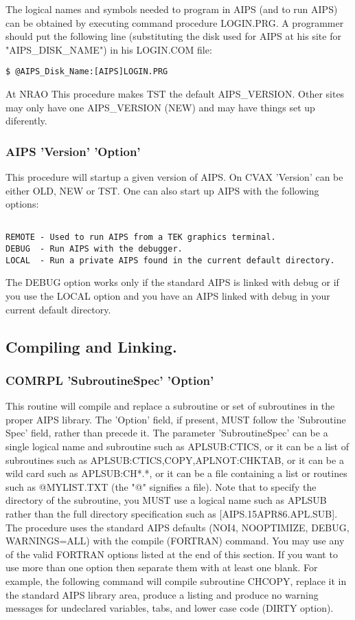 The logical names and symbols needed to program in AIPS (and to run
AIPS) can be obtained by executing command procedure LOGIN.PRG.  A
programmer should put the following line (substituting the disk used
for AIPS at his site for "AIPS\_DISK\_NAME") in his LOGIN.COM file:
\begin{verbatim}
$ @AIPS_Disk_Name:[AIPS]LOGIN.PRG
\end{verbatim}

At NRAO This procedure makes TST the default AIPS\_VERSION.  Other
sites may only have one AIPS\_VERSION (NEW) and may have things set up
diferently.

\subsubsection{ AIPS 'Version' 'Option' }

This procedure will startup a given version of AIPS.  On CVAX
'Version' can be either OLD, NEW or TST.  One can
also start up AIPS with the following options:
\begin{verbatim}

REMOTE - Used to run AIPS from a TEK graphics terminal.
DEBUG  - Run AIPS with the debugger.
LOCAL  - Run a private AIPS found in the current default directory.

\end{verbatim}

The DEBUG option works only if the standard AIPS is linked with debug
or if you use the LOCAL option and you have an AIPS linked with debug
in your current default directory.

\subsection{ Compiling and Linking. }
\subsubsection{ COMRPL 'SubroutineSpec' 'Option' }

This routine will compile and replace a subroutine or set of subroutines
in the proper AIPS library.  The 'Option' field, if present, MUST follow
the 'Subroutine Spec' field, rather than precede it.  The parameter
'SubroutineSpec' can be a single logical name and subroutine such as
APLSUB:CTICS, or it can be a list of subroutines such as
APLSUB:CTICS,COPY,APLNOT:CHKTAB, or it can be a wild card such as
APLSUB:CH*.*, or it can be a file containing a list or routines such
as @MYLIST.TXT (the "@" signifies a file).  Note that to specify the
directory of the subroutine, you MUST use a logical name such as APLSUB
rather than the full directory specification such as
[AIPS.15APR86.APL.SUB].  The procedure uses the standard AIPS defaults
(NOI4, NOOPTIMIZE, DEBUG, WARNINGS=ALL) with the compile (FORTRAN)
command.  You may use any of the valid FORTRAN options listed at the end
of this section.  If you want to use more than one option then separate
them with at least one blank.  For example, the following command will
compile subroutine CHCOPY, replace it in the standard AIPS library area,
produce a listing and produce no warning messages for undeclared
variables, tabs, and lower case code (DIRTY option).

